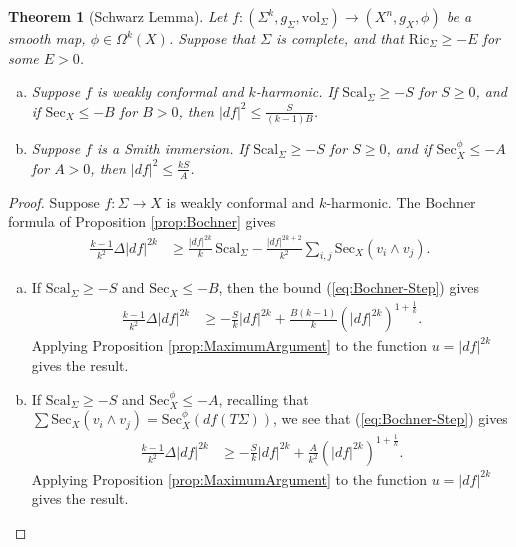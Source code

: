 \documentclass[11pt]{article}
\newcommand{\vol}{\mathrm{vol}}
\newtheorem{thm}{Theorem}[section]
\theoremstyle{definition}
\numberwithin{equation}{section}
\begin{document}
\begin{thm}[Schwarz Lemma] \label{thm:SchwarzMain} Let $f \colon (\Sigma^k, g_\Sigma, \vol_\Sigma) \to (X^n, g_X, \phi)$ be a smooth map, $\phi \in \Omega^k(X)$.  Suppose that $\Sigma$ is complete, and that $\mathrm{Ric}_\Sigma \geq -E$ for some $E > 0$.
\begin{enumerate}[(a)]
\item Suppose $f$ is weakly conformal and $k$-harmonic.  If $\mathrm{Scal}_\Sigma \geq -S$ for $S \geq 0$, and if $\mathrm{Sec}_X \leq -B$ for $B > 0$, then $|df|^2 \leq \frac{S}{(k-1)B}$.
\item Suppose $f$ is a Smith immersion.  If $\mathrm{Scal}_\Sigma \geq -S$ for $S \geq 0$, and if $\mathrm{Sec}^\phi_X \leq -A$ for $A > 0$, then $|df|^2 \leq \frac{kS}{A}$.
\end{enumerate}
\end{thm}

\begin{proof} Suppose $f \colon \Sigma \to X$ is weakly conformal and $k$-harmonic.  The Bochner formula of Proposition \ref{prop:Bochner} gives
\begin{align} \label{eq:Bochner-Step}
\frac{k-1}{k^2} \Delta |df|^{2k} & \geq \frac{|df|^{2k}}{k}\,\mathrm{Scal}_\Sigma - \frac{|df|^{2k+2}}{k^2} \sum_{i,j} \mathrm{Sec}_X(v_i \wedge v_j).
\end{align}
\begin{enumerate}[(a)]
\item If $\mathrm{Scal}_\Sigma \geq -S$ and $\mathrm{Sec}_X \leq -B$, then the bound (\ref{eq:Bochner-Step}) gives
\begin{align*}
\frac{k-1}{k^2} \Delta |df|^{2k} & \geq -\frac{S}{k} |df|^{2k} + \frac{B(k-1)}{k} \left( |df|^{2k} \right)^{1 + \frac{1}{k}}.
\end{align*}
Applying Proposition \ref{prop:MaximumArgument} to the function $u = |df|^{2k}$ gives the result.
\item If $\mathrm{Scal}_\Sigma \geq -S$ and $\mathrm{Sec}^\phi_X \leq -A$, recalling that $\sum \mathrm{Sec}_X(v_i \wedge v_j) = \mathrm{Sec}^\phi_X( df(T\Sigma))$, we see that (\ref{eq:Bochner-Step}) gives
\begin{align*}
\frac{k-1}{k^2} \Delta |df|^{2k} & \geq -\frac{S}{k}|df|^{2k} + \frac{A}{k^2} (|df|^{2k})^{1 + \frac{1}{k}}.
\end{align*}
Applying Proposition \ref{prop:MaximumArgument} to the function $u = |df|^{2k}$ gives the result.
\end{enumerate}
\end{proof}
\end{document}
